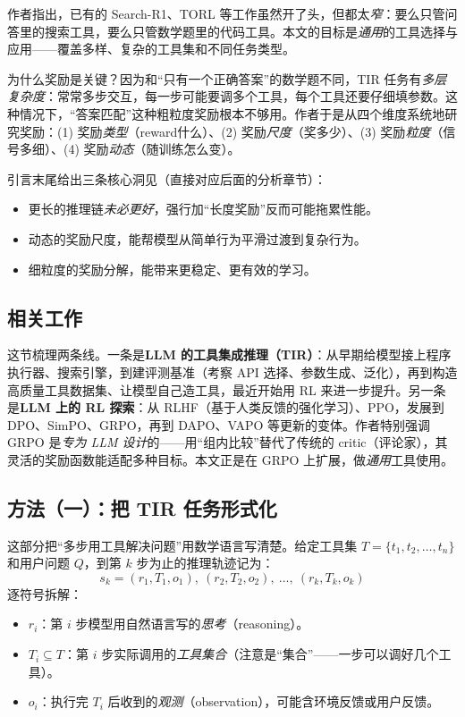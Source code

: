 \documentclass[11pt,UTF8,fontset=fandol]{ctexart}
\begin{document}
作者指出，已有的 Search-R1、TORL 等工作虽然开了头，但都太\emph{窄}：要么只管问答里的搜索工具，要么只管数学题里的代码工具。本文的目标是\emph{通用}的工具选择与应用——覆盖多样、复杂的工具集和不同任务类型。

为什么奖励是关键？因为和“只有一个正确答案”的数学题不同，TIR 任务有\emph{多层复杂度}：常常多步交互，每一步可能要调多个工具，每个工具还要仔细填参数。这种情况下，“答案匹配”这种粗粒度奖励根本不够用。作者于是从四个维度系统地研究奖励：(1) 奖励\emph{类型}（reward什么）、(2) 奖励\emph{尺度}（奖多少）、(3) 奖励\emph{粒度}（信号多细）、(4) 奖励\emph{动态}（随训练怎么变）。

引言末尾给出三条核心洞见（直接对应后面的分析章节）：

\begin{itemize}[leftmargin=1.5em]
\item 更长的推理链\emph{未必更好}，强行加“长度奖励”反而可能拖累性能。
\item 动态的奖励尺度，能帮模型从简单行为平滑过渡到复杂行为。
\item 细粒度的奖励分解，能带来更稳定、更有效的学习。
\end{itemize}

\subsection{相关工作}

这节梳理两条线。一条是\textbf{LLM 的工具集成推理（TIR）}：从早期给模型接上程序执行器、搜索引擎，到建评测基准（考察 API 选择、参数生成、泛化），再到构造高质量工具数据集、让模型自己造工具，最近开始用 RL 来进一步提升。另一条是\textbf{LLM 上的 RL 探索}：从 RLHF（基于人类反馈的强化学习）、PPO，发展到 DPO、SimPO、GRPO，再到 DAPO、VAPO 等更新的变体。作者特别强调 GRPO 是\emph{专为 LLM 设计}的——用“组内比较”替代了传统的 critic（评论家），其灵活的奖励函数能适配多种目标。本文正是在 GRPO 上扩展，做\emph{通用}工具使用。

\subsection{方法（一）：把 TIR 任务形式化}

这部分把“多步用工具解决问题”用数学语言写清楚。给定工具集 $T=\{t_1,t_2,\dots,t_n\}$ 和用户问题 $Q$，到第 $k$ 步为止的推理轨迹记为：
\[
s_k = (r_1,T_1,o_1),\ (r_2,T_2,o_2),\ \dots,\ (r_k,T_k,o_k)
\]
逐符号拆解：
\begin{itemize}[leftmargin=1.5em]
\item $r_i$：第 $i$ 步模型用自然语言写的\emph{思考}（reasoning）。
\item $T_i \subseteq T$：第 $i$ 步实际调用的\emph{工具集合}（注意是“集合”——一步可以调好几个工具）。
\item $o_i$：执行完 $T_i$ 后收到的\emph{观测}（observation），可能含环境反馈或用户反馈。
\end{itemize}
\end{document}
